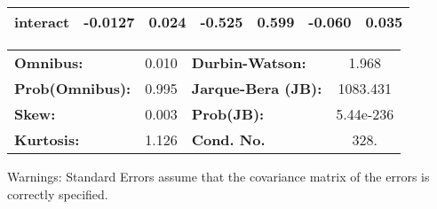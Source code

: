 \begin{center}
\begin{tabular}{lcccccc}
\textbf{interact} &      -0.0127  &        0.024     &    -0.525  &         0.599        &       -0.060    &        0.035     \\
\bottomrule
\end{tabular}
\begin{tabular}{lclc}
\textbf{Omnibus:}       &  0.010 & \textbf{  Durbin-Watson:     } &     1.968  \\
\textbf{Prob(Omnibus):} &  0.995 & \textbf{  Jarque-Bera (JB):  } &  1083.431  \\
\textbf{Skew:}          &  0.003 & \textbf{  Prob(JB):          } & 5.44e-236  \\
\textbf{Kurtosis:}      &  1.126 & \textbf{  Cond. No.          } &      328.  \\
\bottomrule
\end{tabular}
\end{center}

Warnings: \newline
 [1] Standard Errors assume that the covariance matrix of the errors is correctly specified.
